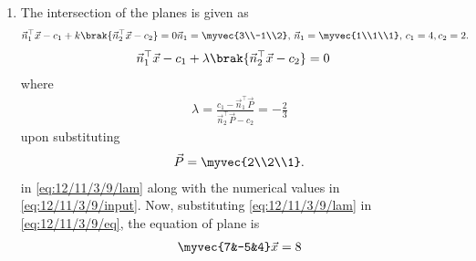 \begin{enumerate}[label=\thesubsection.\arabic*.,ref=\thesubsection.\theenumi]
	\item 
The intersection of the planes is given as
\begin{align}
	\label{eq:12/11/3/9/input}
\vec{n}_1^{\top}{\vec{x}} - {c}_1 + k\brak{\vec{n}_2^{\top}{\vec{x}} - {c}_2} &= 0
 \vec{n}_1 = \myvec{3\\-1\\2},\,
 \vec{n}_1 = \myvec{1\\1\\1},\,
	c_1 = 4, c_2 = 2.
\end{align}
\begin{align}
	\label{eq:12/11/3/9/eq}
\vec{n}_1^{\top}{\vec{x}} - {c}_1 + \lambda\brak{\vec{n}_2^{\top}{\vec{x}} - {c}_2} &= 0
\end{align}
where 
\begin{align}
	\label{eq:12/11/3/9/lam}
	\lambda = \frac{{c}_1 - \vec{n}_1^{\top}\vec{P}}{\vec{n}_2^{\top}\vec{P} - {c}_2} 
= -\frac{2}{3}  
\end{align}
upon substituting 
\begin{align}
\vec{P} = \myvec{2\\2\\1}.
\end{align}
	in \eqref{eq:12/11/3/9/lam} along with 
the numerical values in 
	\eqref{eq:12/11/3/9/input}.
	Now, substituting
	\eqref{eq:12/11/3/9/lam}
	in \eqref{eq:12/11/3/9/eq},
the equation of plane is 
\begin{align}
 \myvec{7&-5&4}\vec{x} = 8
\end{align}


\end{enumerate}
